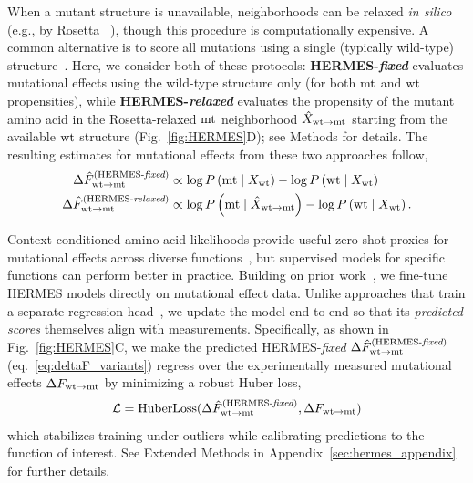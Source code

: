 When a mutant structure is unavailable, neighborhoods can be relaxed {\em in silico} (e.g., by
Rosetta~ \citep{chaudhury_pyrosetta_2010}), though this procedure is computationally expensive. A
common alternative is to score all mutations using a single (typically wild-type)
structure~\citep{dauparas_robust_2022,diaz_stability_2024,pun_learning_2024}. Here, we {consider}
both of these protocols: {\bf HERMES-{\em fixed}} evaluates mutational effects using the wild-type
structure only (for both ${\text{mt}}$ and ${\text{wt}}$ propensities), while {\bf HERMES-{\em relaxed}} evaluates
the propensity of the mutant amino acid in the Rosetta-relaxed ${\text{mt}}$ neighborhood $\hat X_{{\text{wt}} \to
{\text{mt}}}$ starting from the available ${\text{wt}}$ structure (Fig.~\ref{fig:HERMES}D); see Methods for details.
The resulting estimates for mutational effects from these two approaches follow,
\begin{equation}
\begin{aligned}
\Delta \hat F_{{\text{wt}} \to {\text{mt}}}^{\text{(HERMES-{\em fixed})}} &\propto \log P\left({\text{mt}} \mid
X_{{\text{wt}}}\right) - \log P\left({\text{wt}} \mid X_{{\text{wt}}}\right)\\
\Delta \hat F_{{\text{wt}} \to {\text{mt}}}^{\text{(HERMES-{\em relaxed})}} &\propto \log P\left({\text{mt}} \mid \hat
X_{{\text{wt}} \to {\text{mt}}}\right) - \log P\left({\text{wt}} \mid X_{{\text{wt}}}\right).
\end{aligned}
\label{eq:deltaF_variants}
\end{equation}

Context-conditioned amino-acid likelihoods provide useful zero-shot proxies for mutational effects
across diverse functions~\citep{riesselman_deep_2018, meier_language_2021, pun_learning_2024}, but
supervised models for specific functions can perform better in practice. Building on prior
work~\citep{blaabjerg_rapid_2023, diaz_stability_2024}, we fine-tune HERMES models directly on
mutational effect data. Unlike approaches that train a separate regression
head~\citep{blaabjerg_rapid_2023, diaz_stability_2024, dieckhaus_transfer_2024}, we update the
model end-to-end so that its \emph{predicted scores} themselves align with measurements.
Specifically, as shown in Fig.~\ref{fig:HERMES}C,
we make the predicted HERMES-{\em fixed} $\Delta \hat F_{{\text{wt}} \to {\text{mt}}}^{\text{(HERMES-{\em fixed})}}$
(eq.~\ref{eq:deltaF_variants}) regress over the experimentally measured mutational effects $\Delta
F_{{\text{wt}}\to {\text{mt}}}$ by minimizing a robust Huber loss,
\begin{equation}
   \mathcal{L} = \text{HuberLoss}(\Delta \hat F_{{\text{wt}} \to {\text{mt}}}^{\text{(HERMES-{\em fixed})}}, \Delta
   F_{{\text{wt}} \to {\text{mt}}})
\label{eq:loss_function}
\end{equation}
which stabilizes training under outliers while calibrating predictions to the function of interest.
See Extended Methods in Appendix~\ref{sec:hermes_appendix} for further details.\\


